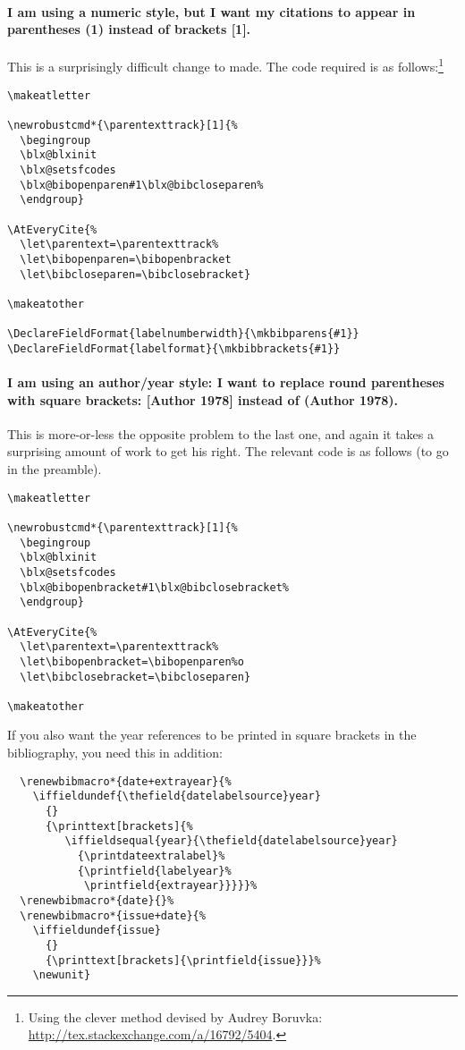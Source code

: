 \paragraph{I am using a numeric style, but I want my citations to appear in parentheses (1) instead of brackets [1].}\label{recipe:brackets}
\begin{marginfigure}[8ex]
\vspace{3pt}%
\caption{Brackets replaced by parentheses}\label{punctcite7}
\end{marginfigure}
 This is a surprisingly difficult change to made. The code required is as follows:\footnote{Using the clever method devised by Audrey Boruvka: \url{http://tex.stackexchange.com/a/16792/5404}.}

\begin{Verbatim}
\makeatletter

\newrobustcmd*{\parentexttrack}[1]{%
  \begingroup
  \blx@blxinit
  \blx@setsfcodes
  \blx@bibopenparen#1\blx@bibcloseparen%
  \endgroup}

\AtEveryCite{%
  \let\parentext=\parentexttrack%
  \let\bibopenparen=\bibopenbracket
  \let\bibcloseparen=\bibclosebracket}

\makeatother

\DeclareFieldFormat{labelnumberwidth}{\mkbibparens{#1}}
\DeclareFieldFormat{labelformat}{\mkbibbrackets{#1}}
\end{Verbatim}

\paragraph{I am using an author/year style: I want to replace round parentheses with square brackets: [Author 1978] instead of (Author 1978).} This is more-or-less the opposite problem to the last one, and again it takes a surprising amount of work to get his right. The relevant code is as follows (to go in the preamble).
\begin{Verbatim}
\makeatletter

\newrobustcmd*{\parentexttrack}[1]{%
  \begingroup
  \blx@blxinit
  \blx@setsfcodes
  \blx@bibopenbracket#1\blx@bibclosebracket%
  \endgroup}

\AtEveryCite{%
  \let\parentext=\parentexttrack%
  \let\bibopenbracket=\bibopenparen%o
  \let\bibclosebracket=\bibcloseparen}

\makeatother
\end{Verbatim}

If you also want the year references to be printed in square brackets in the bibliography, you need this in addition:
\begin{Verbatim}
  \renewbibmacro*{date+extrayear}{%
    \iffieldundef{\thefield{datelabelsource}year}
      {}
      {\printtext[brackets]{%
         \iffieldsequal{year}{\thefield{datelabelsource}year}
           {\printdateextralabel}%
           {\printfield{labelyear}%
            \printfield{extrayear}}}}}%
  \renewbibmacro*{date}{}%
  \renewbibmacro*{issue+date}{%
    \iffieldundef{issue}
      {}
      {\printtext[brackets]{\printfield{issue}}}%
    \newunit}
\end{Verbatim}

